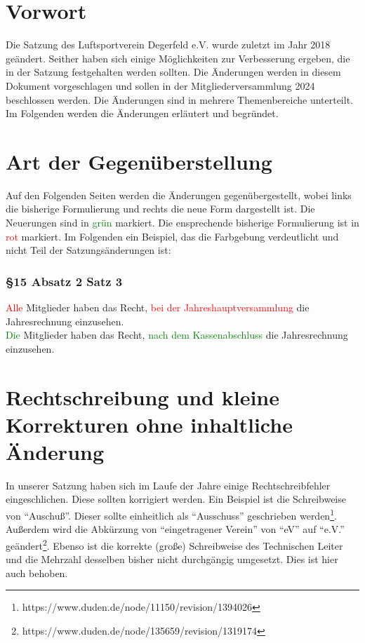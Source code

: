 \documentclass[10pt,a4paper,parskip=half]{scrartcl}
\newcommand{\new}[1]{\textcolor{Green}{#1}}
\newcommand{\old}[1]{\textcolor{Red}{#1}}
\newcommand{\change}[1]{
  \begin{adjustwidth}{20pt}{20pt}
    #1
  \end{adjustwidth}
}
\newcommand{\compare}[3]{\change{\subsubsection*{#1}\begin{multicols}{2}#2\columnbreak\\#3\end{multicols}}}
\begin{document}
\clearpage


\section*{Vorwort}
Die Satzung des Luftsportverein Degerfeld e.V. wurde zuletzt im Jahr 2018 geändert. Seither haben sich einige Möglichkeiten zur Verbesserung ergeben, die in der Satzung festgehalten werden sollten. Die Änderungen werden in diesem Dokument vorgeschlagen und sollen in der Mitgliederversammlung 2024 beschlossen werden. Die Änderungen sind in mehrere Themenbereiche unterteilt. Im Folgenden werden die Änderungen erläutert und begründet.


\tableofcontents
\clearpage

\section*{Art der Gegenüberstellung}

   Auf den Folgenden Seiten werden die Änderungen gegenübergestellt, wobei links die bisherige Formulierung und rechts die neue Form dargestellt ist. Die Neuerungen sind in \new{grün} markiert. Die ensprechende bisherige Formulierung ist in \old{rot} markiert. Im Folgenden ein Beispiel, das die Farbgebung verdeutlicht und nicht Teil der Satzungsänderungen ist:

  \compare{§15 Absatz 2 Satz 3}
  {\old{Alle} Mitglieder haben das Recht, \old{bei der Jahreshauptversammlung} die Jahresrechnung einzusehen.}
  {\new{Die} Mitglieder haben das Recht, \new{nach dem Kassenabschluss} die Jahresrechnung einzusehen.}


  \section{Rechtschreibung und kleine Korrekturen ohne inhaltliche Änderung}
  In unserer Satzung haben sich im Laufe der Jahre einige Rechtschreibfehler eingeschlichen. Diese sollten korrigiert werden.
  Ein Beispiel ist die Schreibweise von "`Auschuß"'. Dieser sollte einheitlich als "`Ausschuss"' geschrieben werden\footnote{https://www.duden.de/node/11150/revision/1394026}.
  Außerdem wird die Abkürzung von "`eingetragener Verein"' von "`eV"' auf "`e.V."' geändert\footnote{https://www.duden.de/node/135659/revision/1319174}.
  Ebenso ist die korrekte (große) Schreibweise des Technischen Leiter und die Mehrzahl desselben bisher nicht durchgängig umgesetzt. Dies ist hier auch behoben.
\end{document}
